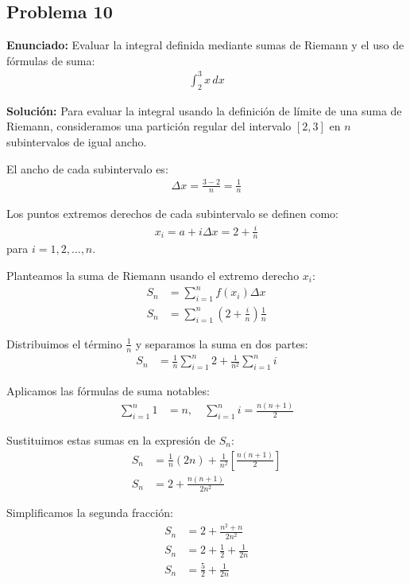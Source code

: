 \subsection*{Problema 10}

\textbf{Enunciado:} 
Evaluar la integral definida mediante sumas de Riemann y el uso de fórmulas de suma:
\begin{align*}
\int_{2}^{3} x \, dx
\end{align*}

\textbf{Solución:}
Para evaluar la integral usando la definición de límite de una suma de Riemann, consideramos una partición regular del intervalo $[2, 3]$ en $n$ subintervalos de igual ancho.

El ancho de cada subintervalo es:
\begin{align*}
\Delta x = \frac{3 - 2}{n} = \frac{1}{n}
\end{align*}

Los puntos extremos derechos de cada subintervalo se definen como:
\begin{align*}
x_i = a + i \Delta x = 2 + \frac{i}{n}
\end{align*}
para $i = 1, 2, \dots, n$.

Planteamos la suma de Riemann usando el extremo derecho $x_i$:
\begin{align*}
S_n &= \sum_{i=1}^{n} f(x_i) \Delta x \\
S_n &= \sum_{i=1}^{n} \left( 2 + \frac{i}{n} \right) \frac{1}{n}
\end{align*}

Distribuimos el término $\frac{1}{n}$ y separamos la suma en dos partes:
\begin{align*}
S_n &= \frac{1}{n} \sum_{i=1}^{n} 2 
+ \frac{1}{n^2} \sum_{i=1}^{n} i
\end{align*}

Aplicamos las fórmulas de suma notables:
\begin{align*}
\sum_{i=1}^{n} 1 &= n, \quad 
\sum_{i=1}^{n} i = \frac{n(n + 1)}{2}
\end{align*}

Sustituimos estas sumas en la expresión de $S_n$:
\begin{align*}
S_n &= \frac{1}{n} (2n) 
+ \frac{1}{n^2} \left[ \frac{n(n + 1)}{2} \right] \\
S_n &= 2 + \frac{n(n + 1)}{2n^2}
\end{align*}

Simplificamos la segunda fracción:
\begin{align*}
S_n &= 2 + \frac{n^2 + n}{2n^2} \\
S_n &= 2 + \frac{1}{2} + \frac{1}{2n} \\
S_n &= \frac{5}{2} + \frac{1}{2n}
\end{align*}

